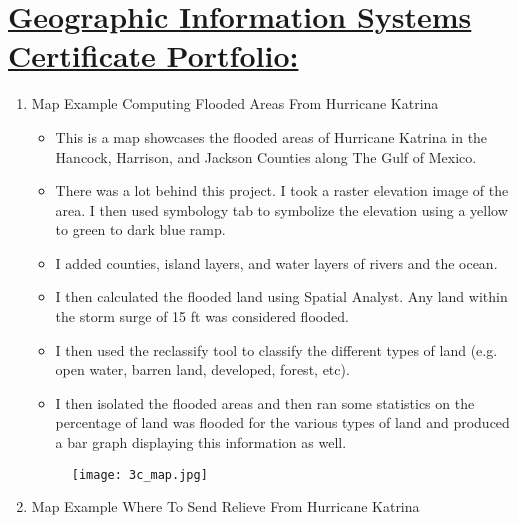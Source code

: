 \documentclass{article}
\begin{document}
\chead{}
\lfoot{}
\cfoot{}
\rfoot{}




\section*{\underline{Geographic Information Systems Certificate Portfolio:}}
\vspace{1pc}

\begin{enumerate}



\item Map Example Computing Flooded Areas From Hurricane Katrina

	\begin{itemize}
	\item This is a map showcases the flooded areas of Hurricane Katrina in the Hancock, Harrison, and Jackson Counties along The Gulf of Mexico.   
	\item There was a lot behind this project. I took a raster elevation image of the area. I then used symbology tab to symbolize the elevation using a yellow to green to dark blue ramp.  
	\item I added counties, island layers, and water layers of rivers and the ocean.
	\item I then calculated the flooded land using Spatial Analyst. Any land within the storm surge of 15 ft was considered flooded. 
	\item I then used the reclassify tool to classify the different types of land (e.g. open water, barren land, developed, forest, etc).
	\item I then isolated the flooded areas and then ran some statistics on the percentage of land was flooded for the various types of land and produced a bar graph displaying this information as well. 



		
	\end{itemize}		
			
			\begin{figure}[H]
				\centering
				\texttt{[image: 3c\_map.jpg]}
				\caption{}
				\label{fig:method}
				\end{figure}
	
\newpage		



\item Map Example Where To Send Relieve From Hurricane Katrina


\end{enumerate}
\end{document}
